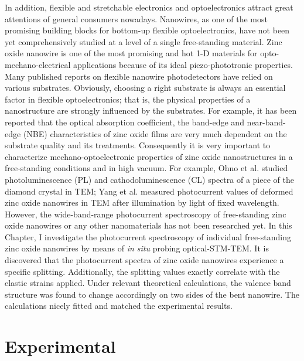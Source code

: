 In addition, flexible and stretchable electronics and optoelectronics attract great attentions of general consumers nowadays. 
Nanowires, as one of the most promising building blocks for bottom-up flexible optoelectronics, have not been yet comprehensively studied at a level of a single free-standing material. 
Zinc oxide nanowire is one of the most promising and hot 1-D materials for opto-mechano-electrical applications because of its ideal piezo-phototronic properties.\cite{L.2011a,L.2010,D.2015,L.2010a} 
Many published reports on flexible nanowire photodetectors have relied on various substrates.\cite{G.2015,H.2014,G.2014} 
Obviously, choosing a right substrate is always an essential factor in flexible optoelectronics; that is, the physical properties of a nanostructure are strongly influenced by the substrates. 
For example, it has been reported that the optical absorption coefficient, the band-edge and near-band-edge (NBE) characteristics of zinc oxide films are very much dependent on the substrate quality and its treatments.\cite{R.1997} 
Consequently it is very important to characterize mechano-optoelectronic properties of zinc oxide nanostructures in a free-standing conditions and in high vacuum. 
For example, Ohno et al. studied photoluminescence (PL) and cathodoluminescence (CL) spectra of a piece of the diamond crystal in TEM;\cite{S.1995} 
Yang et al. measured photocurrent values of deformed zinc oxide nanowires in TEM after illumination by light of fixed wavelength.\cite{E.2012} 
However, the wide-band-range photocurrent spectroscopy of free-standing zinc oxide nanowires or any other nanomaterials has not been researched yet. 
In this Chapter, I investigate the photocurrent spectroscopy of individual free-standing zinc oxide nanowires by means of {\em in situ} probing optical-STM-TEM. 
It is discovered that the photocurrent spectra of zinc oxide nanowires experience a specific splitting. Additionally, the splitting values exactly correlate with the elastic strains applied. 
Under relevant theoretical calculations, the valence band structure was found to change accordingly on two sides of the bent nanowire. The calculations nicely fitted and matched the experimental results. 

\section{Experimental}

